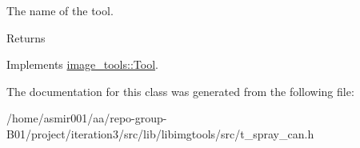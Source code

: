 The name of the tool. 

\begin{DoxyReturn}{Returns}

\end{DoxyReturn}


Implements \hyperlink{classimage__tools_1_1Tool_a251c179e3ac9756d08fbcd082750f8a9}{image\+\_\+tools\+::\+Tool}.



The documentation for this class was generated from the following file\+:\begin{DoxyCompactItemize}
\item 
/home/asmir001/aa/repo-\/group-\/\+B01/project/iteration3/src/lib/libimgtools/src/t\+\_\+spray\+\_\+can.\+h\end{DoxyCompactItemize}

